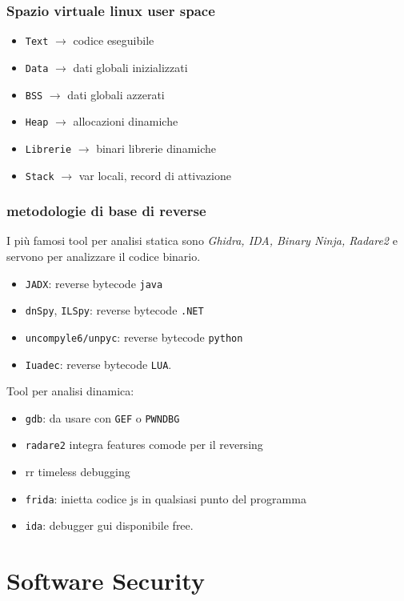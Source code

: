 \subsection{Spazio virtuale linux user space}

\begin{itemize}
    \item \texttt{Text} $\rightarrow$ codice eseguibile
    \item \texttt{Data} $\rightarrow$ dati globali inizializzati
    \item \texttt{BSS} $\rightarrow$ dati globali azzerati
    \item \texttt{Heap} $\rightarrow$ allocazioni dinamiche
    \item \texttt{Librerie} $\rightarrow$ binari librerie dinamiche
    \item \texttt{Stack} $\rightarrow$ var locali, record di attivazione
\end{itemize}

\subsection{metodologie di base di reverse}
I più famosi tool per analisi statica sono
\textit{Ghidra, IDA, Binary Ninja,
Radare2} e servono per analizzare il codice binario. 

\begin{itemize}
\item \texttt{JADX}: reverse bytecode \texttt{java}
\item \texttt{dnSpy}, \texttt{ILSpy}: reverse bytecode \texttt{.NET}
\item \texttt{uncompyle6/unpyc}: reverse bytecode \texttt{python}
\item \texttt{Iuadec}: reverse bytecode \texttt{LUA}.
\end{itemize}
Tool per analisi dinamica:
\begin{itemize}
\item \texttt{gdb}: da usare con \texttt{GEF} o \texttt{PWNDBG}
\item \texttt{radare2} integra features comode per il reversing
\item rr timeless debugging
\item \texttt{frida}: inietta codice js in qualsiasi punto del programma
\item \texttt{ida}: debugger gui disponibile free.
\end{itemize}
\chapter{Software Security}
